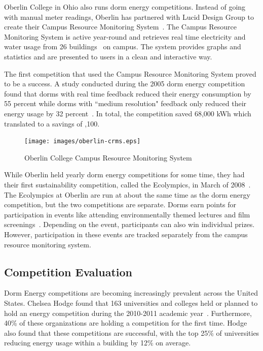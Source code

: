 Oberlin College in Ohio also runs dorm energy competitions.  Instead of going with manual meter readings, Oberlin has partnered with Lucid Design Group to create their Campus Resource Monitoring System~\cite{oberlin-comp}.  The Campus Resource Monitoring System is active year-round and retrieves real time electricity and water usage from 26 buildings~\cite{lucid-oberlin} on campus.  The system provides graphs and statistics and are presented to users in a clean and interactive way.

The first competition that used the Campus Resource Monitoring System proved to be a success.  A study conducted during the 2005 dorm energy competition found that dorms with real time feedback reduced their energy consumption by 55 percent while dorms with ``medium resolution" feedback only reduced their energy usage by 32 percent~\cite{oberlin-goals}.  In total, the competition saved 68,000 kWh which translated to a savings of ,100.

\begin{figure}
	\centering
	\texttt{[image: images/oberlin-crms.eps]}
	\caption{Oberlin College Campus Resource Monitoring System}
\end{figure}

While Oberlin held yearly dorm energy competitions for some time, they had their first sustainability competition, called the Ecolympics, in March of 2008~\cite{oberlin-history}.  The Ecolympics at Oberlin are run at about the same time as the dorm energy competition, but the two competitions are separate.  Dorms earn points for participation in events like attending environmentally themed lectures and film screenings~\cite{oberlin-news}.  Depending on the event, participants can also win individual prizes.  However, participation in these events are tracked separately from the campus resource monitoring system.

\subsection{Competition Evaluation}
\label{competitions-evaluation}

Dorm Energy competitions are becoming increasingly prevalent across the United States. Chelsea Hodge found that 163 universities and colleges held or planned to hold an energy competition during the 2010-2011 academic year~\cite{hodge-competitions}. Furthermore, 40\% of these organizations are holding a competition for the first time. Hodge also found that these competitions are successful, with the top 25\% of universities reducing energy usage within a building by 12\% on average.

